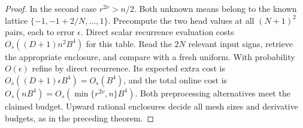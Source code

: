 \begin{proof}
In the second case $r^{2\nu}>n/2$. Both unknown means belong to
the known lattice $\{-1,-1+2/N,\ldots,1\}$. Precompute the
two head values at all $(N+1)^2$ pairs, each to error
$\epsilon$. Direct scalar recurrence evaluation costs
$O_s((D+1)n^2B^4)$ for this table. Read the $2N$ relevant
input signs, retrieve the appropriate enclosure, and compare
with a fresh uniform. With probability $O(\epsilon)$ refine
by direct recurrence. Its expected extra cost is
$O_s((D+1)\epsilon B^4)=O_s(B^4)$, and the total online
cost is $O_s(nB^4)=O_s(\min\{r^{2\nu},n\}B^4)$.
Both preprocessing alternatives meet the
claimed budget. Upward rational enclosures decide all mesh
sizes and derivative budgets, as in the preceding theorem.
\end{proof}

